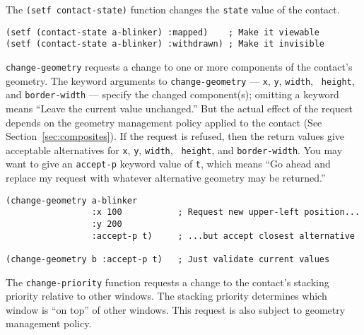 The {\tt (setf contact-state)} function 
changes the {\tt state} value of the contact.

\begin{verbatim}
(setf (contact-state a-blinker) :mapped)    ; Make it viewable
(setf (contact-state a-blinker) :withdrawn) ; Make it invisible
\end{verbatim}

{\tt change-geometry} 
requests a change to one or more components of the contact's geometry.
The keyword
arguments to {\tt change-geometry} --- {\tt x}, {\tt y}, {\tt width}, {\tt
height}, and {\tt border-width} --- specify the changed component(s); omitting a
keyword means ``Leave the current value unchanged.'' But the actual effect of
the request depends on the geometry management
policy applied to the contact (See Section~\ref{sec:composites}). If the
request is refused, then the return values give  acceptable alternatives for {\tt x}, {\tt y}, {\tt width}, {\tt
height}, and {\tt border-width}.  You may want to give an {\tt accept-p} keyword
value of {\tt t}, which means ``Go ahead and replace my request with whatever
alternative geometry may be returned.''

\begin{verbatim}
(change-geometry a-blinker
                 :x 100           ; Request new upper-left position...
                 :y 200
                 :accept-p t)     ; ...but accept closest alternative

(change-geometry b :accept-p t)   ; Just validate current values
\end{verbatim}

\begin{center}
\end{center}


The {\tt change-priority} function 
requests a change to the contact's stacking priority relative to other
windows.  The stacking priority determines which window is ``on top'' of other
windows. This request is also subject to geometry management policy. 

